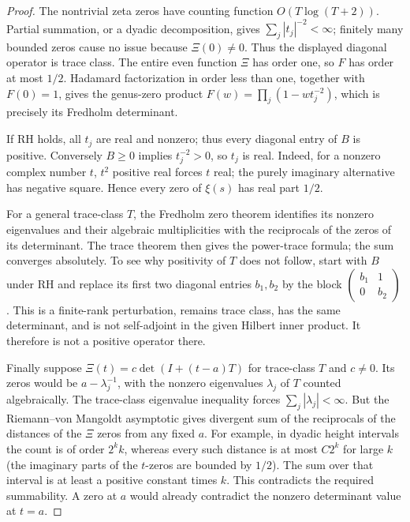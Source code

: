 \begin{proof}
The nontrivial zeta zeros have counting function $O(T\log(T+2))$.
Partial summation, or a dyadic decomposition, gives
$\sum_j|t_j|^{-2}<\infty$; finitely many bounded zeros cause no issue
because $\Xi(0)\ne0$.  Thus the displayed diagonal operator is trace
class.  The entire even function $\Xi$ has order one, so $F$ has
order at most $1/2$.  Hadamard factorization in order less than one,
together with $F(0)=1$, gives the genus-zero product
$F(w)=\prod_j(1-wt_j^{-2})$, which is precisely its Fredholm determinant.

If RH holds, all $t_j$ are real and nonzero; thus every diagonal
entry of $B$ is positive.  Conversely $B\geq0$ implies
$t_j^{-2}>0$, so $t_j$ is real.  Indeed, for a nonzero complex number
$t$, $t^2$ positive real forces $t$ real; the purely imaginary
alternative has negative square.  Hence every zero of $\xi(s)$
has real part $1/2$.

For a general trace-class $T$, the Fredholm zero theorem identifies
its nonzero eigenvalues and their algebraic multiplicities with the
reciprocals of the zeros of its determinant.  The trace theorem then
gives the power-trace formula; the sum converges absolutely.  To see
why positivity of $T$ does not follow, start with $B$ under RH and
replace its first two diagonal entries $b_1,b_2$ by the block
$\left(\begin{smallmatrix}b_1&1\\0&b_2\end{smallmatrix}\right)$.
This is a finite-rank perturbation, remains trace class, has the
same determinant, and is not self-adjoint in the given Hilbert
inner product.  It therefore is not a positive operator there.

Finally suppose $\Xi(t)=c\det(I+(t-a)T)$ for trace-class $T$ and
$c\ne0$.  Its zeros would be $a-\lambda_j^{-1}$, with the nonzero
eigenvalues $\lambda_j$ of $T$ counted algebraically.  The trace-class
eigenvalue inequality forces $\sum_j|\lambda_j|<\infty$.
But the Riemann--von Mangoldt asymptotic gives divergent sum of the
reciprocals of the distances of the $\Xi$ zeros from any fixed $a$.
For example, in dyadic height intervals the count is of order
$2^k k$, whereas every such distance is at most $C2^k$ for large
$k$ (the imaginary parts of the $t$-zeros are bounded by $1/2$).
The sum over that interval is at least a positive constant times
$k$.  This contradicts the required summability.  A zero at $a$
would already contradict the nonzero determinant value at $t=a$.
\end{proof}

